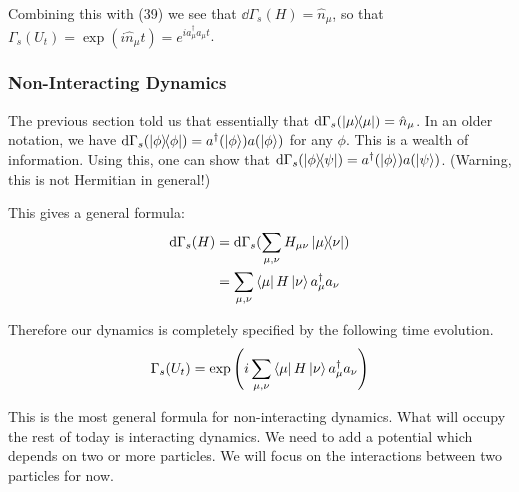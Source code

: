 \documentclass{article}
\begin{document}
Combining this with (39) we see that $\dd \Gamma_s(H) = \hat n_\mu$, so that $\Gamma_s(U_t) = \exp(i\hat n_\mu t) = e^{i a_\mu^\dagger a_\mu t}$.

\subsubsection{Non-Interacting Dynamics}
The previous section told us that essentially that $\dd \Gamma_s(\dyad{\mu}) = \hat n_\mu$.  In an older notation, we have $\dd\Gamma_s(\dyad{\phi}) = a^\dagger(\ket{\phi}) a(\ket{\phi})$ for any $\phi$. This is a wealth of information. Using this, one can show that $\dd\Gamma_s(\dyad{\phi}{\psi}) = a^\dagger(\ket{\phi})a(\ket{\psi})$. (Warning, this is not Hermitian in general!)

This gives a general formula:
\begin{align}
\dd \Gamma_s(H) &= \dd \Gamma_s(\sum_{\mu,\nu}H_{\mu\nu}\dyad{\mu}{\nu})\\
&= \sum_{\mu,\nu}\bra{\mu}H\ket{\nu}a_\mu^\dagger a_\nu
\end{align}

Therefore our dynamics is completely specified by the following time evolution.
\begin{equation}
\Gamma_s(U_t) = \exp\left(i \sum_{\mu,\nu} \bra{\mu}H\ket{\nu}a^\dagger_\mu a_\nu\right)
\end{equation}

This is the most general formula for non-interacting dynamics. What will occupy the rest of today is interacting dynamics. We need to add a potential which depends on two or more particles. We will focus on the interactions between two particles for now.\pagebreak
\end{document}
